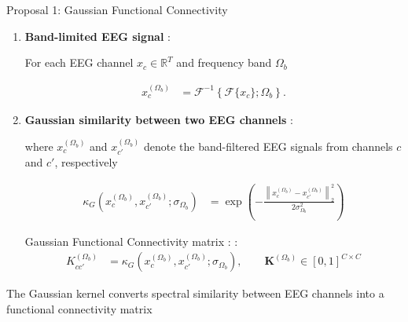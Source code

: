\documentclass[aspectratio=169]{beamer}
\let\oldcite\cite
\renewcommand{\cite}[1]{{\tiny\oldcite{#1}}}
\begin{document}
\begin{frame}{Proposal 1: Gaussian Functional Connectivity}
\scriptsize
\setlength{\abovedisplayskip}{2pt}
\setlength{\belowdisplayskip}{2pt}
\setlength{\jot}{2pt}

\begin{enumerate}
\setlength{\itemsep}{0.10cm}

\item \textbf{Band-limited EEG signal} 
{\scriptsize \cite{cohen2014analyzing}:}

\vspace{0.5cm}

For each EEG channel $x_c \in \mathbb{R}^{T}$ and frequency band $\Omega_b$

\begin{align*}
x_c^{(\Omega_b)}
&=
\mathcal{F}^{-1}
\left\{
\mathcal{F}\{x_c\};\Omega_b
\right\}.
\end{align*}

\item \textbf{Gaussian similarity between two EEG channels} 
{\scriptsize \cite{scholkopf2002learning}:}

\vspace{0.5cm}

where $x_c^{(\Omega_b)}$ and $x_{c'}^{(\Omega_b)}$ denote the band-filtered EEG signals 
from channels $c$ and $c'$, respectively

\begin{align*}
\kappa_G
\left(
x_c^{(\Omega_b)},x_{c'}^{(\Omega_b)};
\sigma_{\Omega_b}
\right)
&=
\exp\left(
-
\frac{
\left\|
x_c^{(\Omega_b)}-x_{c'}^{(\Omega_b)}
\right\|_2^2
}{
2\sigma_{\Omega_b}^2
}
\right)
\end{align*}

\vspace{0.05cm}

\begin{block}{{Gaussian Functional Connectivity matrix} 
{\scriptsize \cite{garciamurillo2023kcsfcnet}:} 
{\scriptsize \cite{garciamurillo2023kcsfcnet}:}}
\begin{align*}
K_{cc'}^{(\Omega_b)}
&=
\kappa_G
\left(
x_c^{(\Omega_b)},x_{c'}^{(\Omega_b)};
\sigma_{\Omega_b}
\right),
\qquad
\mathbf{K}^{(\Omega_b)} \in [0,1]^{C \times C}
\end{align*}
\end{block}

\end{enumerate}

\vspace{0.05cm}

{\centering
\footnotesize
\textcolor{frameblue}{
The Gaussian kernel converts spectral similarity between EEG channels into a functional connectivity matrix
}
\par}

\end{frame}
\end{document}
